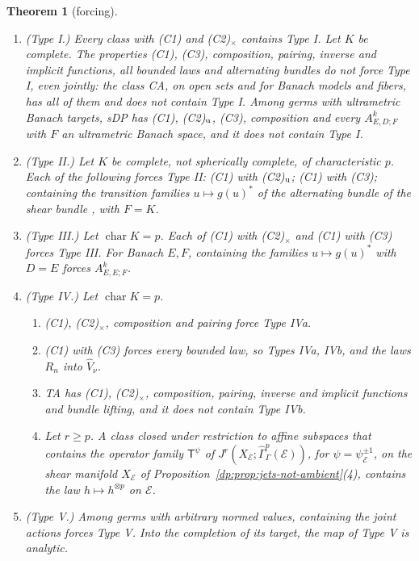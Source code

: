 \documentclass[11pt]{amsart}
\newtheorem{theorem}{Theorem}[section]
\theoremstyle{definition}
\theoremstyle{remark}
\numberwithin{equation}{section}
\theoremstyle{plain}
\theoremstyle{definition}
\theoremstyle{plain}
\newcommand{\hGamma}{\widehat\Gamma}
\begin{document}
\begin{theorem}[forcing]\label{dp:thm:forcing}
\leavevmode
\begin{enumerate}
\item \textup{(Type I.)} Every class with \textup{(C1)} and \textup{(C2)}$_\times$ contains Type I. Let $K$ be complete. The properties \textup{(C1)}, \textup{(C3)}, composition, pairing, inverse and implicit functions, all bounded laws and alternating bundles do not force Type I, even jointly: the class CA, on open sets and for Banach models and fibers, has all of them and does not contain Type I. Among germs with ultrametric Banach targets, sDP has \textup{(C1)}, \textup{(C2)}$_{\rm u}$, \textup{(C3)}, composition and every $A^k_{E,D;F}$ with $F$ an ultrametric Banach space, and it does not contain Type I.
\item \textup{(Type II.)} Let $K$ be complete, not spherically complete, of characteristic $p$. Each of the following forces Type II: \textup{(C1)} with \textup{(C2)}$_{\rm u}$; \textup{(C1)} with \textup{(C3)}; containing the transition families $u\mapsto g(u)^*$ of the alternating bundle of the shear bundle \cite[Proposition~10.1, Corollary~10.2]{I}, with $F=K$.
\item \textup{(Type III.)} Let $\operatorname{char}K=p$. Each of \textup{(C1)} with \textup{(C2)}$_\times$ and \textup{(C1)} with \textup{(C3)} forces Type III. For Banach $E,F$, containing the families $u\mapsto g(u)^*$ with $D=E$ forces $A^k_{E,E;F}$.
\item \textup{(Type IV.)} Let $\operatorname{char}K=p$.
\begin{enumerate}
\item \textup{(C1)}, \textup{(C2)}$_\times$, composition and pairing force Type IVa.
\item \textup{(C1)} with \textup{(C3)} forces every bounded law, so Types IVa, IVb, and the laws $R_n$ into $\widehat V_\nu$.
\item TA has \textup{(C1)}, \textup{(C2)}$_\times$, composition, pairing, inverse and implicit functions and bundle lifting, and it does not contain Type IVb.
\item Let $r\ge p$. A class closed under restriction to affine subspaces that contains the operator family $\mathsf T^\psi$ of $J^r(X_{\mathcal E};\hGamma^p_\Gamma(\mathcal E))$, for $\psi=\psi_{\mathcal E}^{\pm1}$, on the shear manifold $X_{\mathcal E}$ of Proposition~\ref{dp:prop:jets-not-ambient}(4), contains the law $h\mapsto h^{\otimes p}$ on $\mathcal E$.
\end{enumerate}
\item \textup{(Type V.)} Among germs with arbitrary normed values, containing the joint actions forces Type V. Into the completion of its target, the map of Type V is analytic.
\end{enumerate}
\end{theorem}
\end{document}
